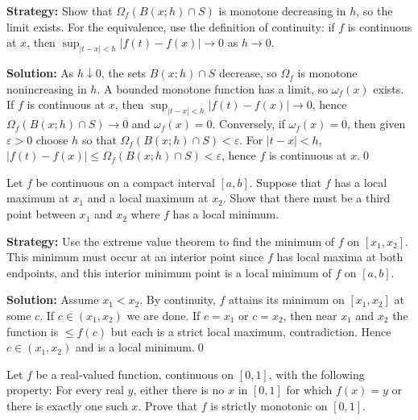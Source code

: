 \noindent\textbf{Strategy:} Show that $\Omega_f(B(x;h) \cap S)$ is monotone decreasing in $h$, so the limit exists. For the equivalence, use the definition of continuity: if $f$ is continuous at $x$, then $\sup_{|t-x|<h} |f(t) - f(x)| \to 0$ as $h \to 0$.

\bigskip\noindent\textbf{Solution:}
As $h\downarrow 0$, the sets $B(x;h)\cap S$ decrease, so $\Omega_f$ is monotone nonincreasing in $h$. A bounded monotone function has a limit, so $\omega_f(x)$ exists. If $f$ is continuous at $x$, then $\sup_{|t-x|<h}|f(t)-f(x)|\to 0$, hence $\Omega_f(B(x;h)\cap S)\to 0$ and $\omega_f(x)=0$. Conversely, if $\omega_f(x)=0$, then given $\varepsilon>0$ choose $h$ so that $\Omega_f(B(x;h)\cap S)<\varepsilon$. For $|t-x|<h$, $|f(t)-f(x)|\le \Omega_f(B(x;h)\cap S)<\varepsilon$, hence $f$ is continuous at $x$.\qed



\begin{problembox}
\begin{problemstatement}
Let \( f \) be continuous on a compact interval \([a, b]\). Suppose that \( f \) has a local maximum at \( x_1 \) and a local maximum at \( x_2 \). Show that there must be a third point between \( x_1 \) and \( x_2 \) where \( f \) has a local minimum.
\end{problemstatement}
\end{problembox}

\noindent\textbf{Strategy:} Use the extreme value theorem to find the minimum of $f$ on $[x_1, x_2]$. This minimum must occur at an interior point since $f$ has local maxima at both endpoints, and this interior minimum point is a local minimum of $f$ on $[a,b]$.

\bigskip\noindent\textbf{Solution:}
Assume $x_1<x_2$. By continuity, $f$ attains its minimum on $[x_1,x_2]$ at some $c$. If $c\in(x_1,x_2)$ we are done. If $c=x_1$ or $c=x_2$, then near $x_1$ and $x_2$ the function is $\le f(c)$ but each is a strict local maximum, contradiction. Hence $c\in(x_1,x_2)$ and is a local minimum.\qed



\begin{problembox}
\begin{problemstatement}
Let \( f \) be a real-valued function, continuous on \([0, 1]\), with the following property: For every real \( y \), either there is no \( x \) in \([0, 1]\) for which \( f(x) = y \) or there is exactly one such \( x \). Prove that \( f \) is strictly monotonic on \([0, 1]\).
\end{problemstatement}
\end{problembox}

